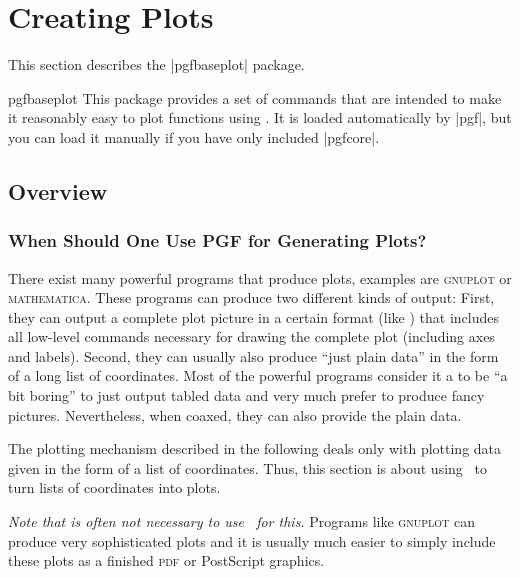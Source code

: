 %
%
%


\section{Creating Plots}

\label{section-plots}

This section describes the |pgfbaseplot| package.

\begin{package}{pgfbaseplot}
  This package provides a set of commands that are intended to make it
  reasonably easy to plot functions using \pgfname. It is loaded
  automatically by |pgf|, but you can load it manually if you have
  only included |pgfcore|.  
\end{package}

\subsection{Overview}

\subsubsection{When Should One Use PGF for Generating Plots? }

There exist many powerful programs that produce plots, examples are
\textsc{gnuplot} or \textsc{mathematica}. These programs can produce
two different kinds of output: First, they can output a complete plot
picture in a certain format (like \pdf) that includes all low-level
commands necessary for drawing the complete plot (including axes and
labels). Second, they can usually also produce ``just plain data'' in
the form of a long list of coordinates. Most of the powerful programs
consider it a to be ``a bit boring'' to just output tabled data and
very much prefer to produce fancy pictures. Nevertheless, when coaxed,
they can also provide the plain data.

The plotting mechanism described in the following deals only with
plotting data given in the form of a list of coordinates. Thus, this
section is about using \pgfname\ to turn lists of coordinates into
plots.

\emph{Note that is often not necessary to use \pgfname\ for this.}
Programs like \textsc{gnuplot} can produce very sophisticated plots
and it is usually much easier to simply include these plots as a
finished \textsc{pdf} or PostScript graphics.

